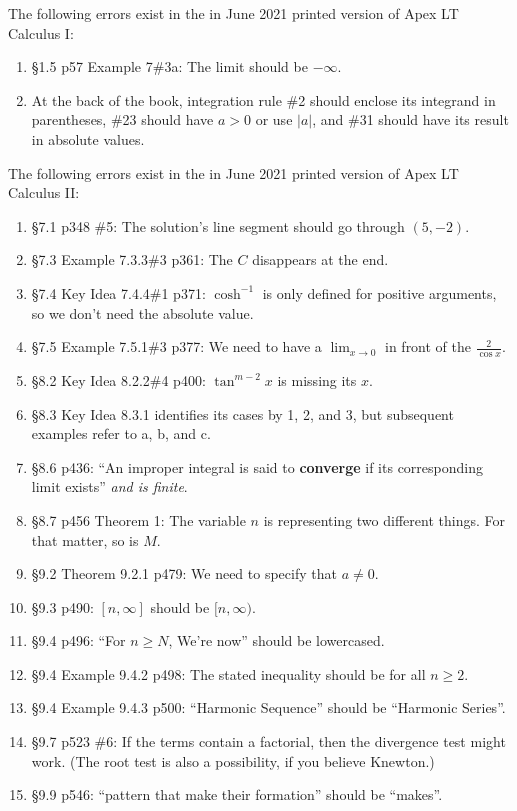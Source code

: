 \documentclass{amsart}
\begin{document}
The following errors exist in the in June 2021 printed version of Apex LT Calculus I:
\begin{enumerate}
\item \S1.5 p57 Example 7\#3a: The limit should be $-\infty$.
\item At the back of the book, integration rule \#2 should enclose its integrand in parentheses, \#23 should have $a>0$ or use $|a|$, and \#31 should have its result in absolute values.
\label{2021-06I}
\end{enumerate}

The following errors exist in the in June 2021 printed version of Apex LT Calculus II:
\begin{enumerate}
\item \S7.1 p348 \#5: The solution's line segment should go through $(5,-2)$.
\item \S7.3 Example 7.3.3\#3 p361: The $C$ disappears at the end.
\item \S7.4 Key Idea 7.4.4\#1 p371: $\cosh^{-1}$ is only defined for positive arguments, so we don't need the absolute value.
\item \S7.5 Example 7.5.1\#3 p377: We need to have a $\lim_{x\to 0}$ in front of the $\frac2{\cos x}$.
\item \S8.2 Key Idea 8.2.2\#4 p400: $\tan^{m-2}x$ is missing its $x$.
\item \S8.3 Key Idea 8.3.1 identifies its cases by 1, 2, and 3, but subsequent examples refer to a, b, and c.
\item \S8.6 p436: ``An improper integral is said to \textbf{converge} if its corresponding limit exists'' \emph{and is finite}.
\item \S8.7 p456 Theorem 1: The variable $n$ is representing two different things.  For that matter, so is $M$.
\item \S9.2 Theorem 9.2.1 p479: We need to specify that $a\neq 0$.
\item \S9.3 p490: $[n,\infty]$ should be $[n,\infty)$.
\item \S9.4 p496: ``For $n\ge N$, We're now'' should be lowercased.
\item \S9.4 Example 9.4.2 p498: The stated inequality should be for all $n\ge 2$.
\item \S9.4 Example 9.4.3 p500: ``Harmonic Sequence'' should be ``Harmonic Series''.
\item \S9.7 p523 \#6: If the terms contain a factorial, then the divergence test might work.  (The root test is also a possibility, if you believe Knewton.)
\item \S9.9 p546: ``pattern that make their formation'' should be ``makes''.

\end{enumerate}
\end{document}
